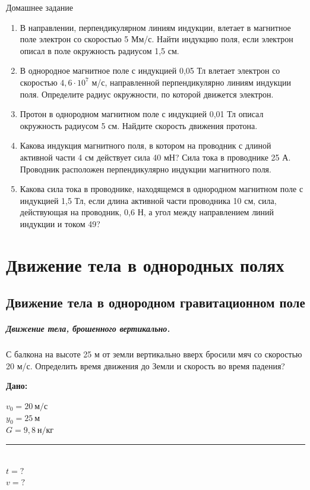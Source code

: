 \documentclass[a5paper, 10pt]{diss_4}
\renewcommand{\'}{\,'}
\begin{document}
\begin{center}
   Домашнее задание
\end{center}
\begin{enumerate}

\item В направлении, перпендикулярном линиям индукции, влетает в магнитное поле электрон со скоростью 5 Мм/с. Найти индукцию поля, если электрон описал в поле окружность радиусом 1,5 см.

\item В однородное магнитное поле с индукцией 0,05 Тл влетает электрон со скоростью $4,6\cdot10^7$ м/с, направленной перпендикулярно линиям индукции поля. Определите радиус окружности, по которой движется электрон.

\item Протон в однородном магнитном поле с индукцией 0,01 Тл описал окружность радиусом 5 см. Найдите скорость движения протона.

\item Какова индукция магнитного поля, в котором на проводник с длиной активной части 4 см действует сила 40 мН? Сила тока в проводнике 25 А. Проводник расположен перпендикулярно индукции магнитного поля.

\item Какова сила тока в проводнике, находящемся в однородном магнитном поле с индукцией 1,5 Тл, если длина активной части проводника 10 см, сила, действующая на проводник, 0,6 Н, а угол между направлением линий индукции и током 49\textdegree?

\end{enumerate}

\section{Движение тела в однородных полях}

\subsection{Движение тела в однородном гравитационном поле}

\subparagraph*{Движение тела, брошенного вертикально.}

С балкона на высоте 25 м от земли вертикально вверх бросили мяч со скоростью 20 м/с. Определить время движения до Земли и скорость во время падения?

\hspace{1cm}\textbf{Дано:}\hspace{.3cm}
\parbox[t]{4cm}{
$v_0 = 20\ м/с$\\
$y_0 = 25\ м$\\
$G=9,8\ н/кг$\\
\rule{4cm}{.4pt}\\
$t = ?$\\
$v = ?$\\
}
\end{document}
